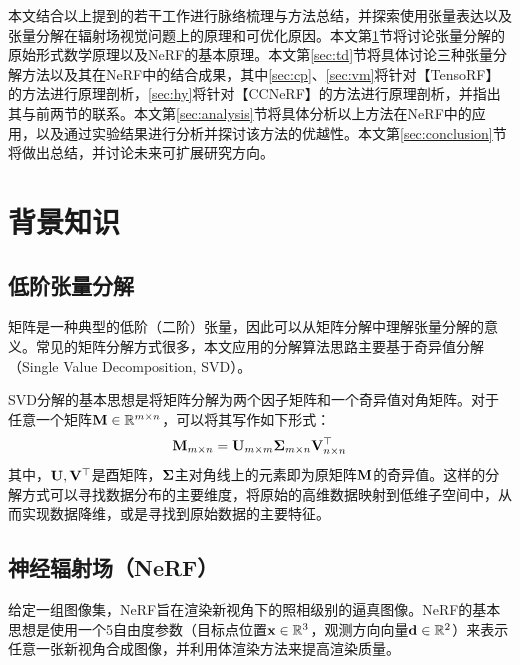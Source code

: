 \documentclass[10pt,twocolumn,letterpaper]{article}
\begin{document}
本文结合以上提到的若干工作进行脉络梳理与方法总结，并探索使用张量表达以及张量分解在辐射场视觉问题上的原理和可优化原因。本文第\ref{sec:related_work}节将讨论张量分解的原始形式数学原理以及NeRF的基本原理。本文第\ref{sec:td}节将具体讨论三种张量分解方法以及其在NeRF中的结合成果，其中\ref{sec:cp}、\ref{sec:vm}将针对【TensoRF】的方法进行原理剖析，\ref{sec:hy}将针对【CCNeRF】的方法进行原理剖析，并指出其与前两节的联系。本文第\ref{sec:analysis}节将具体分析以上方法在NeRF中的应用，以及通过实验结果进行分析并探讨该方法的优越性。本文第\ref{sec:conclusion}节将做出总结，并讨论未来可扩展研究方向。
\section{背景知识}
\label{sec:related_work}

\subsection{低阶张量分解}
矩阵是一种典型的低阶（二阶）张量，因此可以从矩阵分解中理解张量分解的意义。常见的矩阵分解方式很多，本文应用的分解算法思路主要基于奇异值分解（Single Value Decomposition, SVD）。

SVD分解的基本思想是将矩阵分解为两个因子矩阵和一个奇异值对角矩阵。对于任意一个矩阵$\bold M\in\mathbb R^{m\times n}$，可以将其写作如下形式：
\begin{equation}
  \bold M_{m\times n} = \bold U_{m\times m} \bold \Sigma_{m\times n} \bold V_{n\times n}^\top
\end{equation}
\label{eq:1}
其中，$\bold U, \bold V^\top$是酉矩阵，$\bold \Sigma$主对角线上的元素即为原矩阵$\bold M$的奇异值。这样的分解方式可以寻找数据分布的主要维度，将原始的高维数据映射到低维子空间中，从而实现数据降维，或是寻找到原始数据的主要特征。

\subsection{神经辐射场（NeRF）}
给定一组图像集，NeRF旨在渲染新视角下的照相级别的逼真图像。NeRF的基本思想是使用一个5自由度参数（目标点位置$\bold x\in\mathbb R^3$，观测方向向量$\bold d\in\mathbb R^2$）来表示任意一张新视角合成图像，并利用体渲染方法来提高渲染质量。
\end{document}

